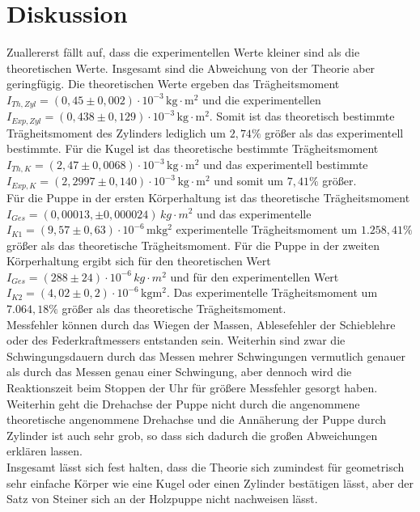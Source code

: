 \newpage
\section{Diskussion}
\label{sec:Diskussion}
Zuallererst fällt auf, dass die experimentellen Werte kleiner sind als die theoretischen Werte.
Insgesamt sind die Abweichung von der Theorie aber geringfügig. Die theoretischen Werte ergeben 
das Trägheitsmoment $I_{Th, Zyl} = \left(0{,}45 \pm 0{,}002 \right) \cdot 10^{-3} \, \mathrm{kg}\cdot\mathrm{m^2}$ und 
die experimentellen $I_{Exp, Zyl} = (0{,}438 \pm 0{,}129)\cdot 10^{-3}\, \mathrm{kg \cdot m^2}$. Somit ist das theoretisch bestimmte Trägheitsmoment
des Zylinders lediglich um $2{,}74\%$ größer als das experimentell bestimmte. Für die Kugel ist das theoretische bestimmte 
Trägheitsmoment $I_{Th, K} = \left(2{,}47 \pm 0{,}0068 \right) \cdot 10^{-3} \, \mathrm{kg}\cdot\mathrm{m^2}$ und das
experimentell bestimmte $I_{Exp, K} = (2{,}2997 \pm 0{,}140)\cdot 10^{-3} \, \mathrm{kg \cdot m^2}$ und somit um $7{,}41\%$ größer.\\
Für die Puppe in der ersten Körperhaltung ist das theoretische Trägheitsmoment $I_{Ges} = (0,00013 ,\pm 0,000024) \, kg \cdot m^2$ und das experimentelle
$I_{K1} = (9{,}57 \pm 0{,}63) \cdot 10^{-6}\, \mathrm{mkg^2}$ experimentelle Trägheitsmoment um $1.258{,}41 \%$ größer als das theoretische Trägheitsmoment.
Für die Puppe in der zweiten Körperhaltung ergibt sich für den theoretischen Wert $I_{Ges} = (288 \pm 24)\cdot 10^{-6} \, kg \cdot m^2$ und für den experimentellen Wert $ I_{K2} = (4{,}02 \pm 0{,}2) \cdot 10^{-6}\, \mathrm{kgm^2}$. 
Das experimentelle Trägheitsmoment um $7.064{,}18 \%$  größer als das theoretische Trägheitsmoment.\\
Messfehler können durch das Wiegen der Massen, Ablesefehler der Schieblehre oder des Federkraftmessers entstanden sein. Weiterhin sind zwar die
Schwingungsdauern durch das Messen mehrer Schwingungen vermutlich genauer als durch das Messen genau einer Schwingung, aber dennoch wird die Reaktionszeit beim 
Stoppen der Uhr für größere Messfehler gesorgt haben.\\
Weiterhin geht die Drehachse der Puppe nicht durch die angenommene theoretische angenommene Drehachse und die Annäherung der Puppe durch Zylinder ist auch sehr grob,
so dass sich dadurch die großen Abweichungen erklären lassen.\\
Insgesamt lässt sich fest halten, dass die Theorie sich zumindest für geometrisch sehr einfache Körper wie eine Kugel oder einen Zylinder bestätigen lässt, aber
der Satz von Steiner sich an der Holzpuppe nicht nachweisen lässt.

